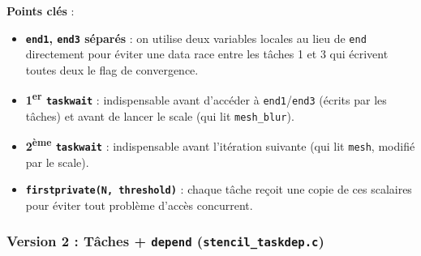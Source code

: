 \documentclass[12pt,a4paper]{article}
\begin{document}
\textbf{Points clés} :
\begin{itemize}
  \item \textbf{\texttt{end1}, \texttt{end3} séparés} : on utilise deux
    variables locales au lieu de \texttt{end} directement pour éviter une data
    race entre les tâches 1 et 3 qui écrivent toutes deux le flag de
    convergence.
  \item \textbf{1\textsuperscript{er} \texttt{taskwait}} : indispensable avant
    d'accéder à \texttt{end1}/\texttt{end3} (écrits par les tâches) et avant de
    lancer le scale (qui lit \texttt{mesh\_blur}).
  \item \textbf{2\textsuperscript{ème} \texttt{taskwait}} : indispensable avant
    l'itération suivante (qui lit \texttt{mesh}, modifié par le scale).
  \item \textbf{\texttt{firstprivate(N, threshold)}} : chaque tâche reçoit une
    copie de ces scalaires pour éviter tout problème d'accès concurrent.
\end{itemize}

\subsubsection{Version 2 : Tâches + \texttt{depend} (\texttt{stencil\_taskdep.c})}
\end{document}
